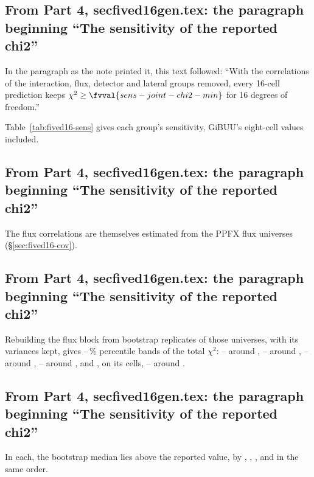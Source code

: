\subsection{From Part 4, secfived16gen.tex: the paragraph beginning ``The sensitivity of the reported chi2''}
In the paragraph as the note printed it, this text followed: ``With the correlations of the interaction, flux, detector and lateral groups removed, every 16-cell prediction keeps $\chi^2\geq\fvval{sens-joint-chi2-min}$ for 16 degrees of freedom.''\par
Table~\ref{tab:fived16-sens} gives each group's sensitivity, GiBUU's eight-cell values included.

\subsection{From Part 4, secfived16gen.tex: the paragraph beginning ``The sensitivity of the reported chi2''}
The flux correlations are themselves estimated from the  PPFX flux universes (\S\ref{sec:fived16-cov}).

\subsection{From Part 4, secfived16gen.tex: the paragraph beginning ``The sensitivity of the reported chi2''}
Rebuilding the flux block from  bootstrap replicates of those universes, with its variances kept, gives --\,\% percentile bands of the total $\chi^2$:  -- around ,  -- around ,  -- around ,  -- around , and , on its  cells, -- around .

\subsection{From Part 4, secfived16gen.tex: the paragraph beginning ``The sensitivity of the reported chi2''}
In each, the bootstrap median lies above the reported value, by , , ,  and  in the same order.

